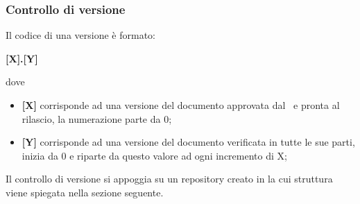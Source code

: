 \subsubsection{Controllo di versione}\label{Versionamento}
Il codice di una versione è formato: 
\begin{center}
	\textbf{[X].[Y]}
\end{center}
dove 
\begin{itemize}
	\item \textbf{[X]} corrisponde ad una versione del documento approvata dal \Responsabile\ e pronta al rilascio, la numerazione parte da 0;
	\item \textbf{[Y]} corrisponde ad una versione del documento verificata in tutte le sue parti, inizia da 0 e riparte da questo valore ad ogni incremento di X;
\end{itemize}
Il controllo di versione si appoggia su un repository creato in  la cui struttura viene spiegata nella sezione seguente.

